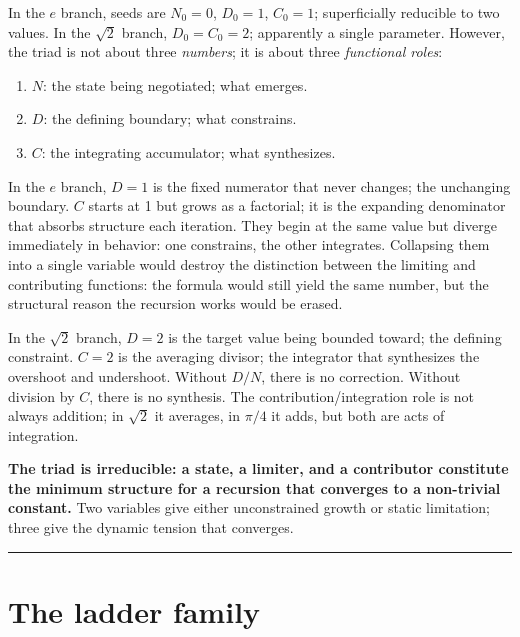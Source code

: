\documentclass[12pt]{article}
\providecommand{\tightlist}{%
  \setlength{\itemsep}{0pt}\setlength{\parskip}{0pt}}
\begin{document}
In the \(e\) branch, seeds are \(N_0 = 0\), \(D_0 = 1\), \(C_0 = 1\);
superficially reducible to two values. In the \(\sqrt{2}\) branch,
\(D_0 = C_0 = 2\); apparently a single parameter. However, the triad is
not about three \emph{numbers}; it is about three \emph{functional
roles}:

\begin{enumerate}
\def\labelenumi{\arabic{enumi}.}
\tightlist
\item
  \textbf{\(N\)}: the state being negotiated; what emerges.
\item
  \textbf{\(D\)}: the defining boundary; what constrains.
\item
  \textbf{\(C\)}: the integrating accumulator; what synthesizes.
\end{enumerate}

In the \(e\) branch, \(D = 1\) is the fixed numerator that never
changes; the unchanging boundary. \(C\) starts at 1 but grows as a
factorial; it is the expanding denominator that absorbs structure each
iteration. They begin at the same value but diverge immediately in
behavior: one constrains, the other integrates. Collapsing them into a
single variable would destroy the distinction between the limiting and
contributing functions: the formula would still yield the same number,
but the structural reason the recursion works would be erased.

In the \(\sqrt{2}\) branch, \(D = 2\) is the target value being bounded
toward; the defining constraint. \(C = 2\) is the averaging divisor; the
integrator that synthesizes the overshoot and undershoot. Without
\(D/N\), there is no correction. Without division by \(C\), there is no
synthesis. The contribution/integration role is not always addition; in
\(\sqrt{2}\) it averages, in \(\pi/4\) it adds, but both are acts of
integration.

\textbf{The triad is irreducible: a state, a limiter, and a contributor
constitute the minimum structure for a recursion that converges to a
non-trivial constant.} Two variables give either unconstrained growth or
static limitation; three give the dynamic tension that converges.

\begin{center}\rule{0.5\linewidth}{0.5pt}\end{center}

\section{The ladder family}\label{the-ladder-family}
\end{document}
